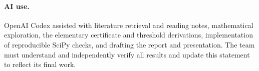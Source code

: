 \documentclass{article}
\begin{document}
\paragraph{AI use.}
OpenAI Codex assisted with literature retrieval and reading notes, mathematical exploration, the elementary certificate and threshold derivations, implementation of reproducible SciPy checks, and drafting the report and presentation. The team must understand and independently verify all results and update this statement to reflect its final work.
\end{document}
